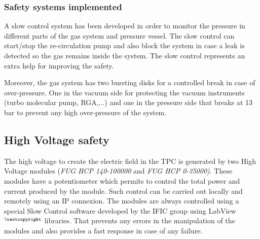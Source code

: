 %
%


\subsubsection{Safety systems implemented}
A slow control system has been developed in order to monitor the pressure in different parts of the gas system and pressure vessel. The slow control can start/stop the re-circulation pump and also block the system in case a leak is detected so the gas remains inside the system. The slow control represents an extra help for improving the safety.

Moreover, the gas system has two bursting disks for a controlled break in case of over-pressure. One in the vacuum side for protecting the vacuum instruments (turbo molecular pump, RGA,...) and one in the pressure side that breaks at 13 bar to prevent any high over-pressure of the system.



\subsection{High Voltage safety}

The high voltage to create the electric field in the TPC is generated by two High Voltage modules (\textit{FUG HCP 140-100000} and \textit{FUG HCP 0-35000)}. These modules have a potentiometer which permits to control the total power and current produced by the module. Such control can be carried out locally and remotely  using an IP connexion. The modules are always controlled using a special Slow Control software developed by the IFIC group using LabView$^{\textcopyright}$ libraries. That prevents any errors in the manipulation of the modules and also provides a fast response in case of any failure.

